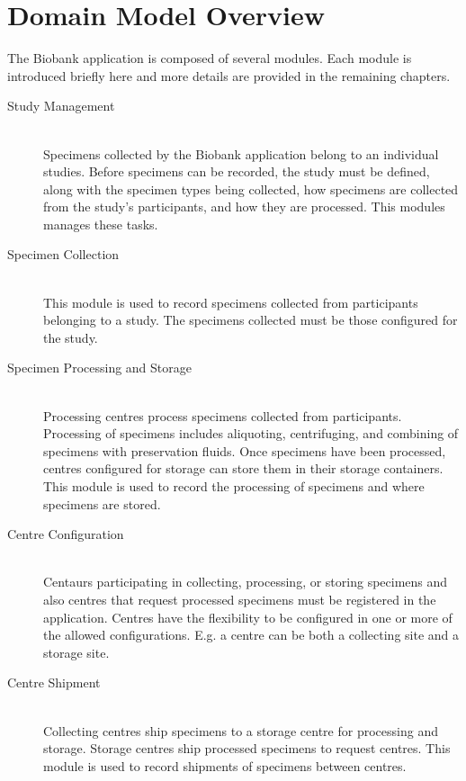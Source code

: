 \chapter{Domain Model Overview}

The Biobank application is composed of several modules. Each module is
introduced briefly here and more details are provided in the remaining
chapters.

\begin{description}

  \item[Study Management] \hfill \\ Specimens collected by the Biobank
    application belong to an individual studies. Before specimens can be
    recorded, the study must be defined, along with the specimen types being
    collected, how specimens are collected from the study's participants, and
    how they are processed. This modules manages these tasks.

  \item[Specimen Collection] \hfill \\ This module is used to record
    specimens collected from participants belonging to a study. The specimens
    collected must be those configured for the study.

  \item[Specimen Processing and Storage] \hfill \\ Processing centres process
    specimens collected from participants. Processing of specimens includes
    aliquoting, centrifuging, and combining of specimens with preservation
    fluids.  Once specimens have been processed, centres configured for storage
    can store them in their storage containers. This module is used to record
    the processing of specimens and where specimens are stored.

  \item[Centre Configuration] \hfill \\ Centaurs participating in collecting,
    processing, or storing specimens and also centres that request processed
    specimens must be registered in the application. Centres have the
    flexibility to be configured in one or more of the allowed
    configurations. E.g. a centre can be both a collecting site and a storage
    site.

  \item[Centre Shipment] \hfill \\ Collecting centres ship specimens to a
    storage centre for processing and storage. Storage centres ship processed
    specimens to request centres. This module is used to record shipments of
    specimens between centres.


\end{description}
